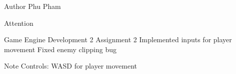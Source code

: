 \begin{DoxyAuthor}{Author}
Phu Pham
\end{DoxyAuthor}
\begin{DoxyAttention}{Attention}
\begin{DoxyVerb}Game Engine Development 2 Assignment 2
Implemented inputs for player movement
Fixed enemy clipping bug
\end{DoxyVerb}
 
\end{DoxyAttention}
\begin{DoxyNote}{Note}
Controls\+: WASD for player movement 
\end{DoxyNote}
